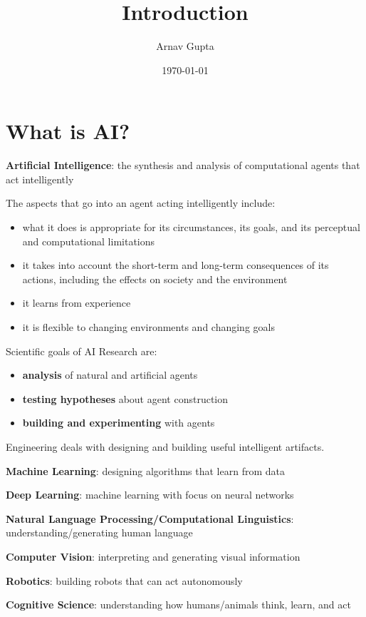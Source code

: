 \documentclass[11pt]{article}
\author{Arnav Gupta}
\date{\today}
\title{Introduction}
\begin{document}
\maketitle
\tableofcontents

\section{What is AI?}
\label{sec:org123e719}
\textbf{Artificial Intelligence}: the synthesis and analysis of computational agents that act intelligently

The aspects that go into an agent acting intelligently include:
\begin{itemize}
\item what it does is appropriate for its circumstances, its goals, and its perceptual and computational
limitations
\item it takes into account the short-term and long-term consequences of its actions, including the effects
on society and the environment
\item it learns from experience
\item it is flexible to changing environments and changing goals
\end{itemize}

Scientific goals of AI Research are:
\begin{itemize}
\item \textbf{analysis} of natural and artificial agents
\item \textbf{testing hypotheses} about agent construction
\item \textbf{building and experimenting} with agents
\end{itemize}

Engineering deals with designing and building useful intelligent artifacts.

\textbf{Machine Learning}: designing algorithms that learn from data

\textbf{Deep Learning}: machine learning with focus on neural networks

\textbf{Natural Language Processing/Computational Linguistics}: understanding/generating human language

\textbf{Computer Vision}: interpreting and generating visual information

\textbf{Robotics}: building robots that can act autonomously

\textbf{Cognitive Science}: understanding how humans/animals think, learn, and act
\end{document}
